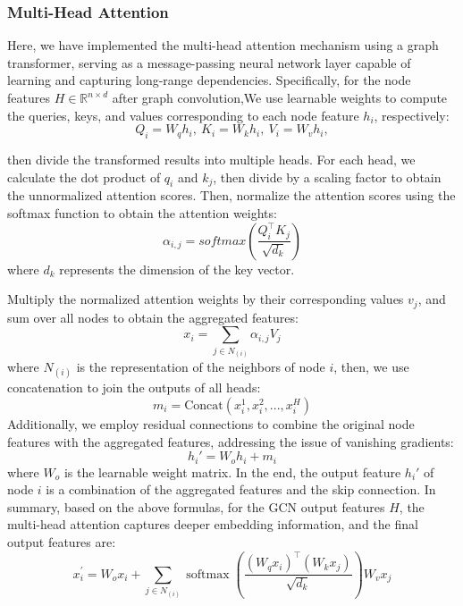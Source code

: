 \documentclass[a4paper,fleqn]{cas-dc}
\begin{document}
\subsubsection{Multi-Head Attention}
Here, we have implemented the multi-head attention\cite{cordonnier2020multi} mechanism using a graph transformer\cite{shi2021maskedlabelpredictionunified}, serving as a message-passing neural network layer capable of learning and capturing long-range dependencies. Specifically, for the node features \(H \in \mathbb{R}^{n \times d} \) after graph convolution,We use learnable weights to compute the queries, keys, and values corresponding to each node feature \( h_i \), respectively:
\begin{equation}
	Q_i = W_qh_i, \ K_i = W_kh_i, \ V_i = W_vh_i, 
\end{equation}

then divide the transformed results into multiple heads. For each head, we calculate the dot product of \( q_i \) and \( k_j \), then divide by a scaling factor to obtain the unnormalized attention scores. Then, normalize the attention scores using the softmax function\cite{liu2017largemarginsoftmaxlossconvolutional} to obtain the attention weights:
\begin{equation}
	\alpha_{i,j} = softmax(\frac{{Q}_i^\top {K}_j}{\sqrt{d_k}})
\end{equation}
where \( d_k \) represents the dimension of the key vector. 

Multiply the normalized attention weights by their corresponding values \({v}_j\), and sum over all nodes to obtain the aggregated features:
\begin{equation}
	{x}_i = \sum_{j \in {N}_{(i)}} \alpha_{i,j} {V}_j
\end{equation}
where \({N}_{(i)}\) is the representation of the neighbors of node \(i\),
then, we use concatenation to join the outputs of all heads:
\begin{equation}
	{m}_i = \text{Concat}({x}_i^1, {x}_i^2, ..., {x}_i^H)
\end{equation}
Additionally, we employ residual connections\cite{szegedy2017inception} to combine the original node features with the aggregated features, addressing the issue of vanishing gradients:
\begin{equation}
	{h}_i' = {W}_o {h}_i + {m}_i
\end{equation}
where \({W}_o\) is the learnable weight matrix. In the end, the output feature \({h}_i'\) of node \(i\) is a combination of the aggregated features and the skip connection.
In summary, based on the above formulas, for the GCN output features \( H \), the multi-head attention captures deeper embedding information, and the final output features are:
\begin{equation}
	x_{i}^{\prime} = W_{o}x_{i} + \sum_{j \in {N}_(i)} \operatorname{softmax}\left(\frac{\left(W_{q} x_{i}\right)^{\top}\left(W_{k} x_{j}\right)}{\sqrt{d_{k}}}\right)W_{v}x_{j}
\end{equation}
\end{document}
